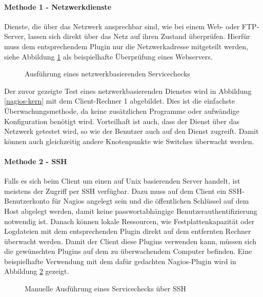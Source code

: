 \paragraph{Methode 1 - Netzwerkdienste}

Dienste, die über das Netzwerk ansprechbar sind, wie bei einem Web- oder \gls{FTP}-Server, lassen sich direkt über das Netz auf ihren Zustand überprüfen.
Hierfür muss dem entsprechendem Plugin nur die Netzwerkadresse mitgeteilt werden, siehe Abbildung \ref{check-http} als beispielhafte Überprüfung eines Webservers.
\begin{figure}[ht]  
	\centering
		\caption{Ausführung eines netzwerkbasierenden Servicechecks}
		\label{check-http}
\end{figure}
Der zuvor gezeigte Test eines netzwerkbasierenden Dienstes wird in Abbildung \ref{nagios-kern} mit dem Client-Rechner 1 abgebildet.
Dies ist die einfachste Überwachungsmethode, da keine zusätzlichen Programme oder aufwändige Konfiguration benötigt wird.
Vorteilhaft ist auch, dass der Dienst über das Netzwerk getestet wird, so wie der Benutzer auch auf den Dienst zugreift.
Damit können auch gleichzeitig andere Knotenpunkte wie Switches überwacht werden.

\paragraph{Methode 2 - SSH}
Falls es sich beim Client um einen auf Unix basierenden Server handelt, ist meistens der Zugriff per \gls{SSH} verfügbar.
Dazu muss auf dem Client ein \gls{SSH}-Benutzerkonto für Nagios angelegt sein und die öffentlichen Schlüssel auf dem Host abgelegt werden, damit keine passwortabhängige Benutzerauthentifizierung notwendig ist.
Danach können lokale Ressourcen, wie Festplattenkapazität oder Logdateien mit dem entsprechenden Plugin direkt auf dem entfernten Rechner überwacht werden.
Damit der Client diese Plugins verwenden kann, müssen sich die gewünschten Plugins auf dem zu überwachendem Computer befinden.
Eine beispielhafte Verwendung mit dem dafür gedachten Nagios-Plugin  wird in Abbildung \ref{check-ssh} gezeigt.
\begin{figure}[ht]
	\centering
		\caption{Manuelle Ausführung eines Servicechecks über SSH}
		\label{check-ssh}
\end{figure}

